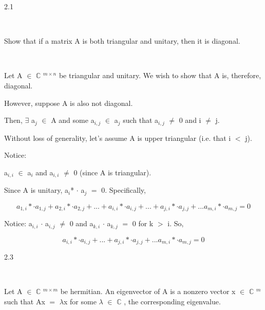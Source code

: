 \documentclass[12pt]{article}
\newcommand{\mt}[1]{\ensuremath{#1}}
\newcommand{\bc}{\mt{\mathbb{C}} }       %
\newcommand{\mem}{\mt{\in} }
\newcommand{\exs}{\mt{\exists} }
\newcommand{\ls}{\mt{<} }
\newcommand{\gr}{\mt{>} }
\newcommand{\eql}{\mt{=} }
\newcommand{\uw}[2]{#1\mt{_{#2}}}
\newcommand{\uf}[2]{#1\mt{^{#2}}}
\begin{document}
2.1

\

Show that if a matrix A is both triangular and unitary, then it is diagonal.

\

Let A \mem \uf{\bc}{m \times n} be triangular and unitary. We wish to show that A is, therefore, diagonal.

However, suppose A is also not diagonal.

Then, \exs \uw{a}{j} \mem A and some \uw{a}{i, j} \mem \uw{a}{j} such that \uw{a}{i, j} $\neq$ 0 and i $\neq$ j.

Without loss of generality, let's assume A is upper triangular (i.e. that i \ls j).

Notice: 

\uw{a}{i, i} \mem \uw{a}{i} and \uw{a}{i, i} $\neq$ 0 (since A is triangular).

Since A is unitary, \uw{a}{i}* $\cdot$ \uw{a}{j} \eql 0. Specifically,

\begin{displaymath}
  a_{1, i}* \cdot a_{1, j} + a_{2, i}* \cdot a_{2, j} + ... + a_{i, i}* \cdot a_{i, j} + ... + a_{j, i}* \cdot a_{j, j} +  ... a_{m, i}* \cdot a_{m, j} \eql 0
\end{displaymath}

Notice: \uw{a}{i, i} $\cdot$ \uw{a}{i, j} $\neq$ 0 and \uw{a}{k, i} $\cdot$ \uw{a}{k, j} \eql 0 for k \gr i. So,

\begin{displaymath}
  a_{i, i}* \cdot a_{i, j} + ... + a_{j, i}* \cdot a_{j, j} +  ... a_{m, i}* \cdot a_{m, j} \eql 0
\end{displaymath}

2.3

\

Let A \mem \uf{\bc}{m \times m} be hermitian. An eigenvector of A is a nonzero vector x \mem \uf{\bc}{m} such that Ax \eql $\lambda$x for some $\lambda$ \mem \bc, the corresponding eigenvalue.
\end{document}
